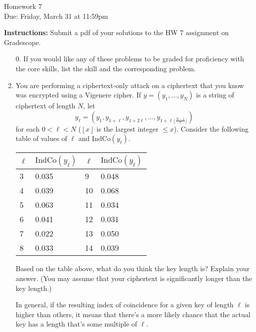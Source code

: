 \documentclass[12pt]{article}
\newcommand{\n}{\vspace{0.3cm}}
\begin{document}
\begin{center}
{\Large Homework 7}\\
Due: Friday,  March 31 at 11:59pm\\


\end{center}
{\bf Instructions:} Submit a pdf of your solutions to the HW 7 assignment on Gradescope.  



\begin{enumerate}
\item[0.] If you would like any of these problems to be graded for proficiency with the core skills, list the skill and the corresponding problem. 


\item  You are performing a ciphertext-only attack on a ciphertext that you know was encrypted using a Vigenere cipher.  If $y = (y_1, \ldots, y_{N})$ is a string of ciphertext of length $N$, let $$y_{\ell} = (y_1, y_{1+\ell}, y_{1+2\ell}, \ldots, y_{1+\ell\lfloor{\frac{N-1}{\ell}}\rfloor})$$ for each $0 < \ell <N$ ($\left\lfloor x \right\rfloor$ is the largest integer $\le x$).  Consider the following table of values of $\ell$ and $\mathrm{IndCo}(y_{\ell})$.

\begin{center}
    \begin{tabular}{ l | l | l | l }
    $\ell$ & $\mathrm{IndCo}(y_\ell)$ &  $\ell$ & $\mathrm{IndCo}(y_\ell)$  \\ 
    \hline
    3 & 0.035 & 9  & 0.048\\ 
    4 & 0.039 & 10 & 0.068  \\ 
    5 & 0.063 & 11 & 0.034  \\
    6 & 0.041  & 12 & 0.031  \\
    7 & 0.022  &  13 & 0.050\\
    8 & 0.033  &  14 & 0.039\\
    \end{tabular}
\end{center}

Based on the table above, what do you think the key length is?  Explain your answer. (You may assume that your ciphertext is significantly longer than the key length.) \n

In general, if the resulting index of coincidence for a given key of length \(\ell\) is higher than others, it means that there's a more likely chance that the actual key has a length that's some multiple of \(\ell\). \n


\end{enumerate}
\end{document}
